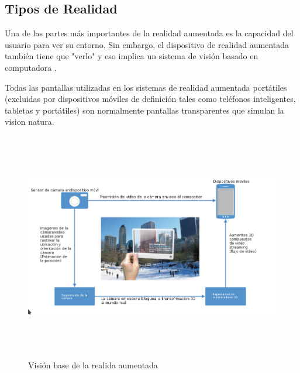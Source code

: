 \subsection{Tipos de Realidad}
Una de las partes más importantes de la realidad aumentada es la capacidad del usuario para ver su entorno. Sin embargo, el dispositivo de realidad aumentada también tiene que "verlo" y eso implica un sistema de visión basado en computadora \cite{B22} .\par
\vspace{5mm}
 Todas las pantallas utilizadas en los sistemas de realidad aumentada portátiles (excluidas por dispositivos móviles de definición tales como teléfonos inteligentes, tabletas y portátiles) son normalmente pantallas transparentes que simulan la vision natura\cite{B22}. \par
\vspace{5mm}
\begin{figure}[h!]
	\centering
	\includegraphics[width=17cm,height=10cm]{imagenes/marcoteorico/ar/visionAR.png}
	\caption{Visión base de la realida aumentada\cite{B22}}
	\label{fig:analogo}
\end{figure}
